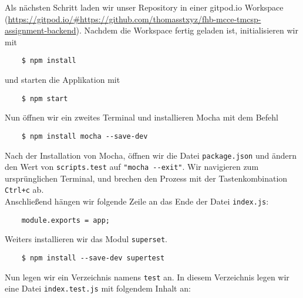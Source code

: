 \noindent
Als nächsten Schritt laden wir unser Repository in einer gitpod.io Workspace
(\url{https://gitpod.io/#https://github.com/thomasstxyz/fhb-mcce-tmcsp-assignment-backend}).
Nachdem die Workspace fertig geladen ist, initialisieren wir mit 

\begin{verbatim}
	$ npm install
\end{verbatim}

\noindent
und starten die Applikation mit 
\begin{verbatim}
	$ npm start
\end{verbatim}

\noindent
Nun öffnen wir ein zweites Terminal und installieren Mocha
\cite{mochajsorgWebsite} mit dem Befehl

\begin{verbatim}
	$ npm install mocha --save-dev
\end{verbatim}

\noindent
Nach der Installation von Mocha, öffnen wir die Datei \verb|package.json|
und ändern den Wert von \verb|scripts.test| auf \verb|"mocha --exit"|.
Wir navigieren zum ursprünglichen Terminal, und brechen den Prozess mit der
Tastenkombination \verb|Ctrl+c| ab. \\

\noindent
Anschließend hängen wir folgende Zeile an das Ende der Datei \verb|index.js|:

\begin{verbatim}
	module.exports = app;
\end{verbatim}

\noindent
Weiters installieren wir das Modul \verb|superset|.

\begin{verbatim}
	$ npm install --save-dev supertest
\end{verbatim}

\noindent
Nun legen wir ein Verzeichnis namens \verb|test| an.
In diesem Verzeichnis legen wir eine Datei \verb|index.test.js| 
mit folgendem Inhalt an:

